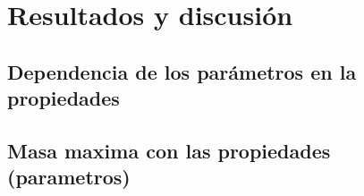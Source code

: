 \chapter{Resultados y discusión}
\thispagestyle{fancy}

\section{Dependencia de los parámetros en la propiedades}

\section{Masa maxima con las propiedades (parametros)}

